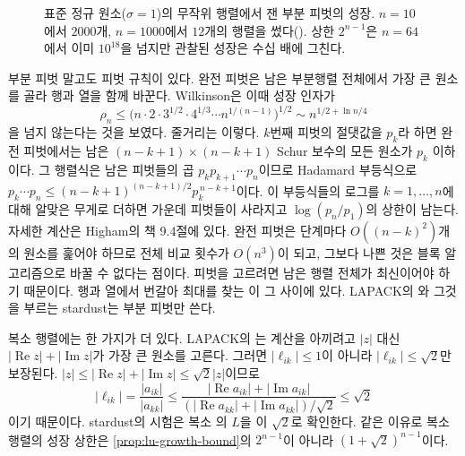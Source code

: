 \begin{figure}[t]
\centering
{}
\caption{표준 정규 원소($\sigma=1$)의 무작위 행렬에서 잰 부분 피벗의 성장. $n=10$에서 $2000$개, $n=1000$에서 $12$개의 행렬을 썼다(). 상한 $2^{n-1}$은 $n=64$에서 이미 $10^{18}$을 넘지만 관찰된 성장은 수십 배에 그친다.}
\label{fig:lu-growth}
\end{figure}

부분 피벗 말고도 피벗 규칙이 있다. 완전 피벗은 남은 부분행렬 전체에서 가장 큰 원소를 골라 행과 열을 함께 바꾼다. Wilkinson은 이때 성장 인자가
\[
\rho_n\le\bigl(n\cdot2\cdot3^{1/2}\cdot4^{1/3}\cdots n^{1/(n-1)}\bigr)^{1/2}\sim n^{1/2+\ln n/4}
\]
을 넘지 않는다는 것을 보였다\cite{wilkinson1961error}. 줄거리는 이렇다. $k$번째 피벗의 절댓값을 $p_k$라 하면 완전 피벗에서는 남은 $(n-k+1)\times(n-k+1)$ Schur 보수의 모든 원소가 $p_k$ 이하이다. 그 행렬식은 남은 피벗들의 곱 $p_kp_{k+1}\cdots p_n$이므로 Hadamard 부등식으로 $p_k\cdots p_n\le(n-k+1)^{(n-k+1)/2}p_k^{\,n-k+1}$이다. 이 부등식들의 로그를 $k=1,\dots,n$에 대해 알맞은 무게로 더하면 가운데 피벗들이 사라지고 $\log(p_n/p_1)$의 상한이 남는다. 자세한 계산은 Higham의 책 9.4절에 있다\cite{higham2002accuracy}. 완전 피벗은 단계마다 $O((n-k)^2)$개의 원소를 훑어야 하므로 전체 비교 횟수가 $O(n^3)$이 되고, 그보다 나쁜 것은 블록 알고리즘으로 바꿀 수 없다는 점이다. 피벗을 고르려면 남은 행렬 전체가 최신이어야 하기 때문이다. 행과 열에서 번갈아 최대를 찾는 이 그 사이에 있다. LAPACK의 와 그것을 부르는 stardust는 부분 피벗만 쓴다.

복소 행렬에는 한 가지가 더 있다. LAPACK의 는 계산을 아끼려고 $|z|$ 대신 $|\operatorname{Re}z|+|\operatorname{Im}z|$가 가장 큰 원소를 고른다. 그러면 $|\ell_{ik}|\le1$이 아니라 $|\ell_{ik}|\le\sqrt2$만 보장된다. $|z|\le|\operatorname{Re}z|+|\operatorname{Im}z|\le\sqrt2|z|$이므로
\[
|\ell_{ik}|=\frac{|a_{ik}|}{|a_{kk}|}\le\frac{|\operatorname{Re}a_{ik}|+|\operatorname{Im}a_{ik}|}{(|\operatorname{Re}a_{kk}|+|\operatorname{Im}a_{kk}|)/\sqrt2}\le\sqrt2
\]
이기 때문이다. stardust의 시험은 복소 의 $L$을 이 $\sqrt2$로 확인한다. 같은 이유로 복소 행렬의 성장 상한은 \cref{prop:lu-growth-bound}의 $2^{n-1}$이 아니라 $(1+\sqrt2)^{n-1}$이다.

